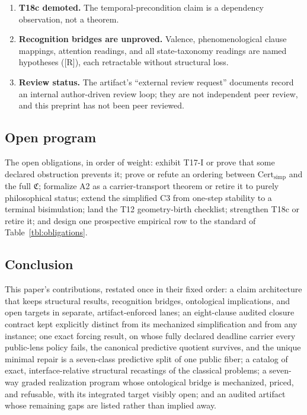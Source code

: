 \documentclass[11pt]{article}
\newcommand{\gradeR}{\textsf{[R]}}
\newcommand{\Cpkg}{\mathfrak{C}}
\newcommand{\Certsimp}{\mathrm{Cert}_{\mathrm{simp}}}
\theoremstyle{definition}
\begin{document}
\begin{enumerate}
unproved in both directions, certificate soundness is assumed where used,
A2 has no formal theorem, and T17-I, the integrated instance, is open
(Section~\ref{sec:t17}).
\item \textbf{T18c demoted.} The temporal-precondition claim is a dependency
observation, not a theorem.
\item \textbf{Recognition bridges are unproved.} Valence, phenomenological
clause mappings, attention readings, and all state-taxonomy readings are
named hypotheses (\gradeR), each retractable without structural loss.
\item \textbf{Review status.} The artifact's ``external review request''
documents record an internal author-driven review loop; they are not
independent peer review, and this preprint has not been peer reviewed.
\end{enumerate}

\subsection{Open program}

The open obligations, in order of weight: exhibit T17-I or prove that some
declared obstruction prevents it; prove or refute an ordering between
$\Certsimp$ and the full $\Cpkg$; formalize A2 as a carrier-transport theorem
or retire it to purely philosophical status; extend the simplified C3 from
one-step stability to a terminal bisimulation; land the T12 geometry-birth
checklist; strengthen T18c or retire it; and design one prospective empirical
row to the standard of Table~\ref{tbl:obligations}.

\subsection{Conclusion}

This paper's contributions, restated once in their fixed order: a claim
architecture that keeps structural results, recognition bridges, ontological
implications, and open targets in separate, artifact-enforced lanes; an
eight-clause audited closure contract kept explicitly distinct from its
mechanized simplification and from any instance; one exact forcing result,
on whose fully declared deadline carrier every public-lens policy fails,
the canonical predictive quotient survives, and the unique minimal repair is a
seven-class predictive split of one public fiber; a catalog of exact,
interface-relative structural recastings of the classical problems; a
seven-way graded realization program whose ontological bridge is mechanized,
priced, and refusable, with its integrated target visibly open; and an
audited artifact whose remaining gaps are listed rather than implied away.
\end{document}
